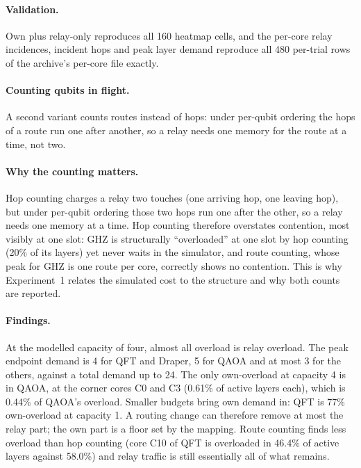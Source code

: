 \paragraph{Validation.} Own plus relay-only reproduces all 160 heatmap cells, and the per-core relay incidences, incident hops and peak layer demand reproduce
all 480 per-trial rows of the archive's per-core file exactly.

\paragraph{Counting qubits in flight.} A second variant counts routes instead of hops: under per-qubit ordering the hops of a route run one after
another, so a relay needs one memory for the route at a time, not two.








\paragraph{Why the counting matters.} Hop counting charges a relay two touches (one arriving hop, one leaving hop), but under per-qubit ordering those two hops run one after the other, so a relay needs one memory at a time. Hop counting therefore overstates
contention, most visibly at one slot: GHZ is structurally ``overloaded'' at one slot by hop counting (20\% of its layers) yet never waits in the simulator, and route counting, whose peak for GHZ is one route per core, correctly shows no contention. This is why Experiment~1 relates the
simulated cost to the structure and why both counts are reported.

\paragraph{Findings.} At the modelled capacity of four, almost all overload is relay overload. The peak endpoint demand is 4 for QFT and Draper, 5 for QAOA and at most 3
for the others, against a total demand up to 24. The only own-overload at capacity 4 is in QAOA, at the corner cores C0 and C3 (0.61\% of active layers each), which is
0.44\% of QAOA's overload. Smaller budgets bring own demand in: QFT is 77\% own-overload at capacity 1. A routing change can therefore remove at most the relay part;
the own part is a floor set by the mapping. Route counting finds less overload than hop counting (core C10 of QFT is overloaded in 46.4\% of active layers against
58.0\%) and relay traffic is still essentially all of what remains.

